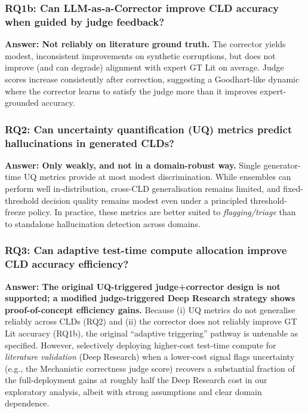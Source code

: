 \subsubsection*{RQ1b: Can LLM-as-a-Corrector improve CLD accuracy when guided by judge feedback?}
\textbf{Answer: Not reliably on literature ground truth.} The corrector yields modest, inconsistent improvements on synthetic corruptions, but does not improve (and can degrade) alignment with expert GT Lit on average. Judge scores increase consistently after correction, suggesting a Goodhart-like dynamic where the corrector learns to satisfy the judge more than it improves expert-grounded accuracy.

\subsubsection*{RQ2: Can uncertainty quantification (UQ) metrics predict hallucinations in generated CLDs?}
\textbf{Answer: Only weakly, and not in a domain-robust way.} Single generator-time UQ metrics provide at most modest discrimination. While ensembles can perform well in-distribution, cross-CLD generalisation remains limited, and fixed-threshold decision quality remains modest even under a principled threshold-freeze policy. In practice, these metrics are better suited to \textit{flagging/triage} than to standalone hallucination detection across domains.

\subsubsection*{RQ3: Can adaptive test-time compute allocation improve CLD accuracy efficiency?}
\textbf{Answer: The original UQ-triggered judge+corrector design is not supported; a modified judge-triggered Deep Research strategy shows proof-of-concept efficiency gains.} Because (i) UQ metrics do not generalise reliably across CLDs (RQ2) and (ii) the corrector does not reliably improve GT Lit accuracy (RQ1b), the original ``adaptive triggering'' pathway is untenable as specified. However, selectively deploying higher-cost test-time compute for \textit{literature validation} (Deep Research) when a lower-cost signal flags uncertainty (e.g., the Mechanistic correctness judge score) recovers a substantial fraction of the full-deployment gains at roughly half the Deep Research cost in our exploratory analysis, albeit with strong assumptions and clear domain dependence.

